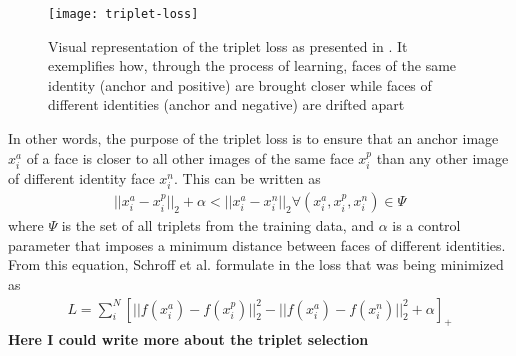 \begin{figure}[h]
	\begin{center}
		\texttt{[image: triplet-loss]}
	\end{center}
	\caption[Triplet loss visualisation]{Visual representation of the triplet loss as presented in \cite{SchroffKP15}. It exemplifies how, through the process of learning, faces of the same identity (anchor and positive) are brought closer while faces of different identities (anchor and negative) are drifted apart }
\end{figure}

In other words, the purpose of the triplet loss is to ensure that an anchor image $x_{i}^{a}$ of a face is closer to all other images of the same face $x_{i}^{p}$ than any other image of different identity face $x_{i}^{n}$. This can be written as
\begin{align}
	||x_{i}^{a}  - x_{i}^{p} ||_{2} + \alpha < ||x_{i}^{a}  - x_{i}^{n} ||_{2} \forall (x_{i}^{a}, x_{i}^{p}, x_{i}^{n}) \in \Psi
\end{align} where $\Psi$ is the set of all triplets from the training data, and $\alpha$ is a control parameter that imposes a minimum distance between faces of different identities. From this equation, Schroff et al. formulate in \cite{SchroffKP15} the loss that was being minimized as 
\begin{align}
L = \sum_{i}^{N} [||f(x_{i}^{a}) - f(x_{i}^{p})||_{2}^{2} - ||f(x_i^a) - f(x_i^n)||_{2}^{2} + \alpha]_{+}
\end{align}
\textbf{Here I could write more about the triplet selection}

